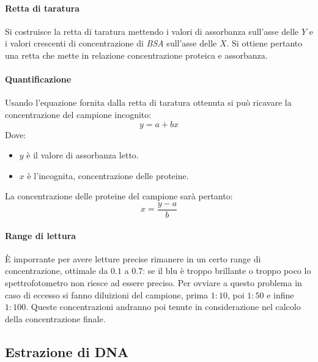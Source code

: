 			\paragraph{Retta di taratura}
			Si costruisce la retta di taratura mettendo i valori di assorbanza sull'asse delle $Y$ e i valori crescenti di concentrazione di \emph{BSA} sull'asse delle $X$. 
			Si ottiene pertanto una retta che mette in relazione concentrazione proteica e assorbanza.

			\paragraph{Quantificazione}
			Usando l'equazione fornita dalla retta di taratura ottenuta si pu\`o ricavare la concentrazione del campione incognito:
			\[y = a + bx\]
			Dove:
			\begin{multicols}{2}
				\begin{itemize}
					\item $y$ \`e il valore di assorbanza letto.
					\item $x$ \`e l'incognita, concentrazione delle proteine.
				\end{itemize}
			\end{multicols}
			La concentrazione delle proteine del campione sar\`a pertanto:
			\[x=\dfrac{y-a}{b}\]

			\paragraph{Range di lettura}
			\`E imporrante per avere letture precise rimanere in un certo range di concentrazione, ottimale da $0.1$ a $0.7$: se il blu \`e troppo brillante o troppo poco lo spettrofotometro non riesce ad essere preciso.
			Per ovviare a questo problema in caso di eccesso si fanno diluizioni del campione, prima $1:10$, poi $1:50$ e infine $1:100$.
			Queste concentrazioni andranno poi tenute in considerazione nel calcolo della concentrazione finale. 

	\subsection{Estrazione di DNA}

